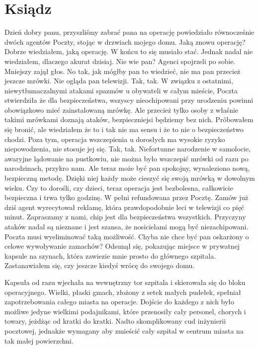 \chapter{Ksiądz} 


\begin{dialogue}
\ds{} Dzień dobry panu, przyszliśmy zabrać pana na operację \dm{} powiedziało równocześnie dwóch agentów Poczty, stojąc w drzwiach mojego domu.
\ds{} Jaką znowu operację? \dm{} Dobrze wiedziałem, jaką operację. W końcu to się musiało stać. Jednak nadal nie wiedziałem, dlaczego akurat dzisiaj.
\ds{} Nie wie pan? \dm{} Agenci spojrzeli po sobie. Mniejszy zajął głos. \dm{} No tak, jak mógłby pan to wiedzieć, nie ma pan przecież jeszcze mrówki. Nie ogląda pan telewizji.
Tak, tak.
W związku z ostatnimi, niewytłumaczalnymi atakami spazmów u obywateli w całym mieście, Poczta stwierdziła że dla bezpieczeństwa, 
wszyscy nieochipowani przy urodzeniu powinni obowiązkowo mieć zainstalowaną mrówkę.
\ds{} Ale przecież tylko osoby z właśnie takimi mrówkami doznają ataków, bezpieczniejsi będziemy bez nich. \dm{} Próbowałem się bronić, ale wiedziałem że
to i tak nie ma sensu i że to nie o bezpieczeństwo chodzi. \dm{} Poza tym, operacja wszczepienia u dorosłych ma wysokie ryzyko niepowodzenia, nie stosuje jej się.
\ds{} Tak, tak. Niefortunne narodzenie w samolocie, awaryjne lądowanie na pustkowiu, nie można było wszczepić mrówki od razu po narodzinach, przykro nam.
Ale teraz może być pan spokojny, wynaleziono nową, bezpieczną metodę. Dzięki niej każdy może cieszyć się swoją mrówką w dowolnym wieku.
Czy to dorośli, czy dzieci, teraz operacja jest bezbolesna, całkowicie bezpieczna i trwa tylko godzinę.
W pełni refundowana przez Pocztę. Zamów już dziś \dm{} agent wyrecytował reklamę, która prawdopodobnie leci w telewizji co pięć minut. \dm{}
Zapraszamy z nami, chip jest dla bezpieczeństwa wszystkich. Przyczyny ataków nadal są nieznane i jest szansa, że nosicielami mogą być niezachipowani.
Poczta musi wyeliminować taką możliwość.
Chyba nie chce być pan oskarżony o celowe wywoływanie zamachów? \dm{} Odsunął się, pokazując miejsce w prywatnej kapsule na szynach, która zawiezie mnie prosto do 
głównego szpitala. Zastanawiałem się, czy jeszcze kiedyś wrócę do swojego domu.
\end{dialogue}

\divider{}

Kapsuła od razu wjechała na wewnętrzny tor szpitala i skierowała się do bloku operacyjnego. 
Wielki, płaski gmach, złożony z setek małych pudełek, spełniał zapotrzebowania całego miasta na operacje.
Dojście do każdego z nich było możliwe jedyne wielkimi podajnikami, które przenosiły cały personel, chorych i towary, jeżdżąc od kratki do kratki.
Nadto skomplikowany cud inżynierii pocztowej, jednakże wymagany aby zmieścić cały szpital w centrum miasta na tak małej powierzchni.

